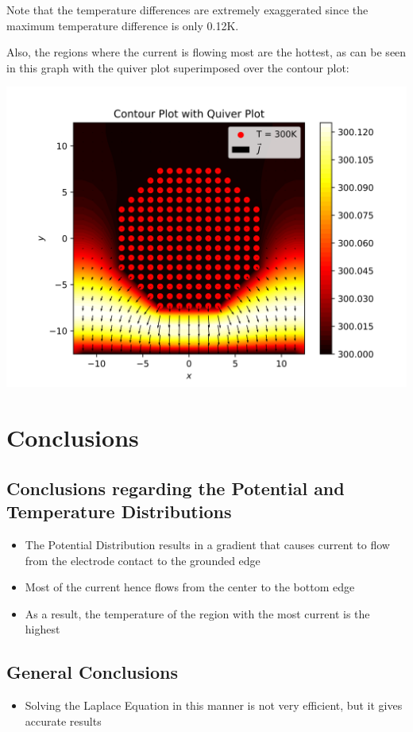 \documentclass[12pt]{article}
\begin{document}
Note that the temperature differences are extremely exaggerated since the maximum temperature difference is only 0.12K.

Also, the regions where the current is flowing most are the hottest, as can be seen in this graph with the quiver plot superimposed over the contour plot:

\begin{center}
    \includegraphics{images/fig8.png}
\end{center}
\pagebreak
\section{Conclusions}
\subsection{Conclusions regarding the Potential and Temperature Distributions}
\begin{itemize}
    \item The Potential Distribution results in a gradient that causes current to flow from the electrode contact to the grounded edge
    \item Most of the current hence flows from the center to the bottom edge
    \item As a result, the temperature of the region with the most current is the highest
\end{itemize}

\subsection{General Conclusions}
\begin{itemize}
    \item Solving the Laplace Equation in this manner is not very efficient, but it gives accurate results
\end{itemize}
\end{document}

